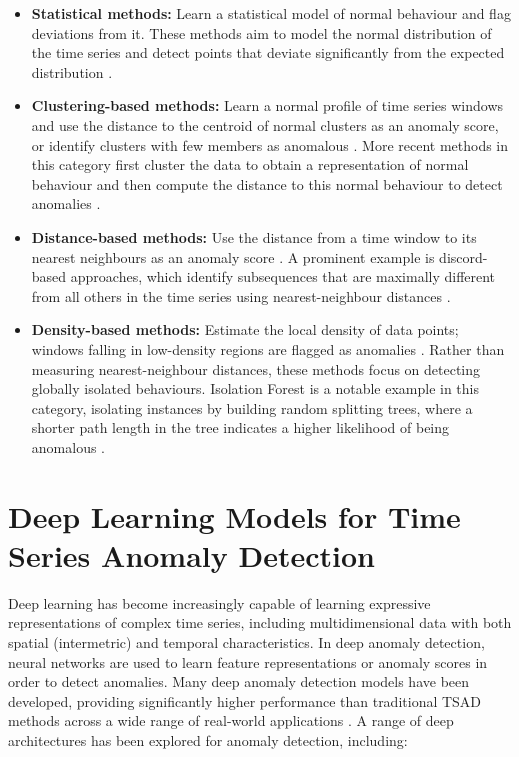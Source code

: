 \documentclass[twoside,11pt,openright]{report}
\begin{document}
\begin{itemize}
    \item \textbf{Statistical methods:} Learn a statistical model of normal behaviour and flag deviations from it. These methods aim to model the normal 
    distribution of the time series and detect points that deviate significantly from the expected 
    distribution \citep{darban2024survey}.
    \item \textbf{Clustering-based methods:} Learn a normal profile of time series windows and 
    use the distance to the centroid of normal clusters as an anomaly score, or identify clusters 
    with few members as anomalous \citep{darban2024survey}. More recent methods in this 
    category first cluster the data to obtain a representation of normal behaviour and then compute 
    the distance to this normal behaviour to detect anomalies \citep{boniol2023trends}.
    \item \textbf{Distance-based methods:} Use the distance from a time window to its nearest 
    neighbours as an anomaly score \citep{darban2024survey}. A prominent example is 
    discord-based approaches, which identify subsequences that are maximally different from 
    all others in the time series using nearest-neighbour distances \citep{boniol2023trends}.
    \item \textbf{Density-based methods:} Estimate the local density of data points; windows 
    falling in low-density regions are flagged as anomalies \citep{darban2024survey}. Rather 
    than measuring nearest-neighbour distances, these methods focus on detecting globally 
    isolated behaviours. Isolation Forest \citep{liu2008isolation} is a notable example in this category, isolating 
    instances by building random splitting trees, where a shorter path length in the tree 
    indicates a higher likelihood of being anomalous \citep{boniol2023trends}.
\end{itemize}



\section{Deep Learning Models for Time Series Anomaly Detection}

Deep learning has become increasingly capable of learning expressive representations of complex time series, including multidimensional data with both spatial (intermetric) and temporal characteristics.
In deep anomaly detection, neural networks are used to learn feature representations or anomaly scores in order to detect anomalies.
Many deep anomaly detection models have been developed, providing significantly higher performance than traditional TSAD methods across a wide range of real-world applications \citep{darban2024survey}.
A range of deep architectures has been explored for anomaly detection, including:
 
\end{document}
